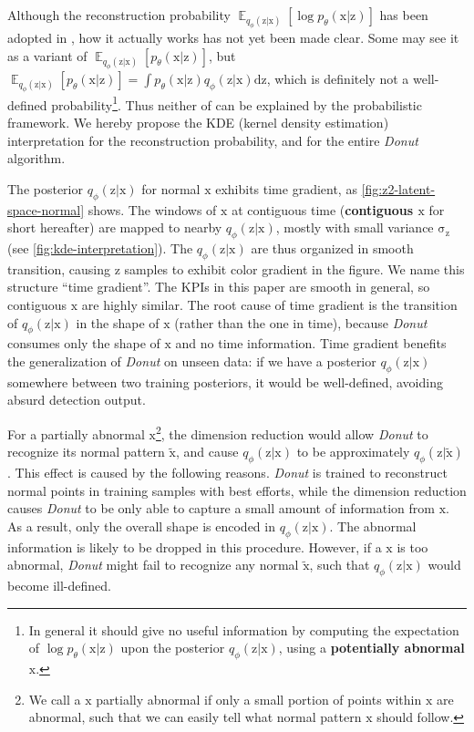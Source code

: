 \documentclass[sigconf]{acmart}
\newcommand{\DONUT}{\textit{Donut}}
\newcommand{\dd}{\mathrm{d}}
\newcommand{\vv}[1]{\bm{\mathrm{{#1}}}}
\newcommand{\EEE}[2]{\operatorname{\mathbb{E}}_{{#1}}\left[{#2}\right]}
\begin{document}
Although the reconstruction probability $\EEE{q_{\phi}(\vv{z}|\vv{x})}{\log p_{\theta}(\vv{x}|\vv{z})}$ has been adopted in \cite{vae-ad,vi-storn}, how it actually works has not yet been made clear.
Some may see it as a variant of $\EEE{q_{\phi}(\vv{z}|\vv{x})}{p_{\theta}(\vv{x}|\vv{z})}$, but $\EEE{q_{\phi}(\vv{z}|\vv{x})}{p_{\theta}(\vv{x}|\vv{z})} = \int p_{\theta}(\vv{x}|\vv{z}) q_{\phi}(\vv{z}|\vv{x}) \dd\vv{z}$, which is definitely not a well-defined probability\footnote{
		In general it should give no useful information by computing the expectation of $\log p_{\theta}(\vv{x}|\vv{z})$ upon the posterior $q_{\phi}(\vv{z}|\vv{x})$, using a \textbf{potentially abnormal} $\vv{x}$.
	}.
Thus neither of \cite{vae-ad,vi-storn} can be explained by the probabilistic framework.
We hereby propose the KDE (kernel density estimation) interpretation for the reconstruction probability, and for the entire \DONUT{} algorithm.

The posterior $q_{\phi}(\vv{z}|\vv{x})$ for normal $\vv{x}$ exhibits time gradient, as \cref{fig:z2-latent-space-normal} shows.
The windows of $\vv{x}$ at contiguous time (\textbf{contiguous $\vv{x}$} for short hereafter) are mapped to nearby $q_{\phi}(\vv{z}|\vv{x})$, mostly with small variance $\vv{\sigma_z}$ (see \cref{fig:kde-interpretation}).
The $q_{\phi}(\vv{z}|\vv{x})$ are thus organized in smooth transition, causing $\vv{z}$ samples to exhibit color gradient in the figure.
We name this structure ``time gradient''.
The KPIs in this paper are smooth in general, so contiguous $\vv{x}$ are highly similar. The root cause of time gradient is the transition of $q_{\phi}(\vv{z}|\vv{x})$ in the shape of $\vv{x}$ (rather than the one in time), because  \DONUT{} consumes only the shape of $\vv{x}$ and no time information.
Time gradient benefits the generalization of \DONUT{} on unseen data: if we have a posterior $q_{\phi}(\vv{z}|\vv{x})$ somewhere between two training posteriors, it would be well-defined, avoiding absurd detection output.

For a partially abnormal $\vv{x}$\footnote{We call a $\vv{x}$ partially abnormal if only a small portion of points within $\vv{x}$ are abnormal, such that we can easily tell what normal pattern $\vv{x}$ should follow.}, the dimension reduction would allow \DONUT{} to recognize its normal pattern $\tilde{\vv{x}}$, and cause $q_{\phi}(\vv{z}|\vv{x})$ to be approximately  $q_{\phi}(\vv{z}|\tilde{\vv{x}})$.
This effect is caused by the following reasons.
\DONUT{} is trained to reconstruct normal points in training samples with best efforts, while the dimension reduction causes \DONUT{} to be only able to capture a small amount of information from $\vv{x}$.
As a result, only the overall shape is encoded in $q_{\phi}(\vv{z}|\vv{x})$.
The abnormal information is likely to be dropped in this procedure.
However, if a $\vv{x}$ is too abnormal, \DONUT{} might fail to recognize any normal $\tilde{\vv{x}}$, such that $q_{\phi}(\vv{z}|\vv{x})$ would become ill-defined.
\end{document}
